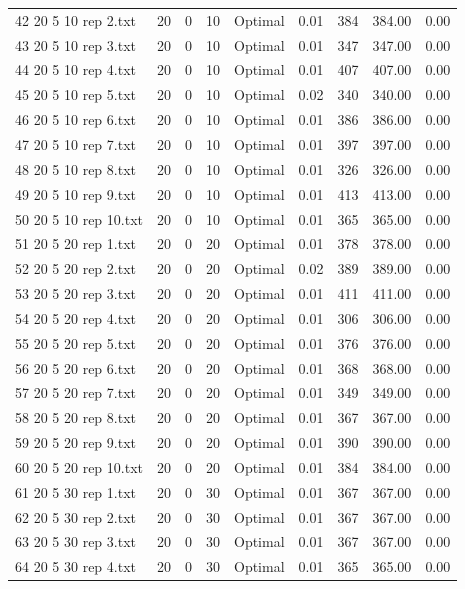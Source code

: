 \begin{longtable}{lrrllrrrr}
42 20 5 10 rep 2.txt & 20 & 0 & 10 & Optimal &  0.01 & 384 & 384.00 &  0.00\\
43 20 5 10 rep 3.txt & 20 & 0 & 10 & Optimal &  0.01 & 347 & 347.00 &  0.00\\
44 20 5 10 rep 4.txt & 20 & 0 & 10 & Optimal &  0.01 & 407 & 407.00 &  0.00\\
45 20 5 10 rep 5.txt & 20 & 0 & 10 & Optimal &  0.02 & 340 & 340.00 &  0.00\\
46 20 5 10 rep 6.txt & 20 & 0 & 10 & Optimal &  0.01 & 386 & 386.00 &  0.00\\
47 20 5 10 rep 7.txt & 20 & 0 & 10 & Optimal &  0.01 & 397 & 397.00 &  0.00\\
48 20 5 10 rep 8.txt & 20 & 0 & 10 & Optimal &  0.01 & 326 & 326.00 &  0.00\\
49 20 5 10 rep 9.txt & 20 & 0 & 10 & Optimal &  0.01 & 413 & 413.00 &  0.00\\
50 20 5 10 rep 10.txt & 20 & 0 & 10 & Optimal &  0.01 & 365 & 365.00 &  0.00\\
51 20 5 20 rep 1.txt & 20 & 0 & 20 & Optimal &  0.01 & 378 & 378.00 &  0.00\\
52 20 5 20 rep 2.txt & 20 & 0 & 20 & Optimal &  0.02 & 389 & 389.00 &  0.00\\
53 20 5 20 rep 3.txt & 20 & 0 & 20 & Optimal &  0.01 & 411 & 411.00 &  0.00\\
54 20 5 20 rep 4.txt & 20 & 0 & 20 & Optimal &  0.01 & 306 & 306.00 &  0.00\\
55 20 5 20 rep 5.txt & 20 & 0 & 20 & Optimal &  0.01 & 376 & 376.00 &  0.00\\
56 20 5 20 rep 6.txt & 20 & 0 & 20 & Optimal &  0.01 & 368 & 368.00 &  0.00\\
57 20 5 20 rep 7.txt & 20 & 0 & 20 & Optimal &  0.01 & 349 & 349.00 &  0.00\\
58 20 5 20 rep 8.txt & 20 & 0 & 20 & Optimal &  0.01 & 367 & 367.00 &  0.00\\
59 20 5 20 rep 9.txt & 20 & 0 & 20 & Optimal &  0.01 & 390 & 390.00 &  0.00\\
60 20 5 20 rep 10.txt & 20 & 0 & 20 & Optimal &  0.01 & 384 & 384.00 &  0.00\\
61 20 5 30 rep 1.txt & 20 & 0 & 30 & Optimal &  0.01 & 367 & 367.00 &  0.00\\
62 20 5 30 rep 2.txt & 20 & 0 & 30 & Optimal &  0.01 & 367 & 367.00 &  0.00\\
63 20 5 30 rep 3.txt & 20 & 0 & 30 & Optimal &  0.01 & 367 & 367.00 &  0.00\\
64 20 5 30 rep 4.txt & 20 & 0 & 30 & Optimal &  0.01 & 365 & 365.00 &  0.00\\

\end{longtable}
